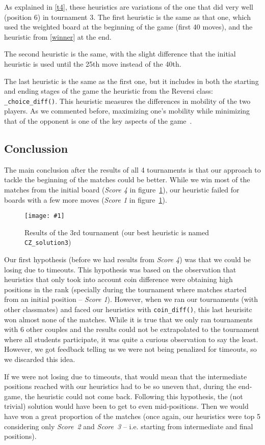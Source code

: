 \documentclass{article}
\newcommand{\myFigure}[4]{%
    \begin{figure}[H]
        \texttt{[image: \#1]}
        \centering
        \caption{#2}
        \label{#3}
    \end{figure}
}
\begin{document}
As explained in \ref{t4}, these heuristics are variations of the one that did very well (position 6) in tournament 3. The first heuristic is the same as that one, which used the weighted board at the beginning of the game (first 40 moves), and the heuristic from \ref{winner} at the end.

The second heuristic is the same, with the slight difference that the initial heuristic is used until the 25th move instead of the 40th.

The last heuristic is the same as the first one, but it includes in both the starting and ending stages of the game the heuristic from the Reversi class: \texttt{\_choice\_diff()}. This heuristic measures the differences in mobility of the two players. As we commented before, maximizing one's mobility while minimizing that of the opponent is one of the key aspects of the game~\autocite{reversistrategy}.

\subsection{Conclussion}

The main conclusion after the results of all 4 tournaments is that our approach to tackle the beginning of the matches could be better. While we win most of the matches from the initial board (\emph{Score 4} in figure~\ref{tour3}), our heuristic failed for boards with a few more moves (\emph{Score 1} in figure~\ref{tour3}).

\myFigure{./images/tour3}{Results of the 3rd tournament (our best heuristic is named \texttt{CZ\_solution3})}{tour3}{.8}

Our first hypothesis (before we had results from \emph{Score 4}) was that we could be losing due to timeouts. This hypothesis was based on the observation that heuristics that only took into account coin difference were obtaining high positions in the rank (specially during the tournament where matches started from an initial position -- \emph{Score 1}). However, when we ran our tournaments (with other classmates) and faced our heuristics with \texttt{coin\_diff()}, this last heurisitc won almost none of the matches. While it is true that we only ran tournaments with 6 other couples and the results could not be extrapolated to the tournament where all students participate, it was quite a curious observation to say the least. However, we got feedback telling us we were not being penalized for timeouts, so we discarded this idea.

If we were not losing due to timeouts, that would mean that the intermediate positions reached with our heuristics had to be so uneven that, during the end-game, the heuristic could not come back. Following this hypothesis, the (not trivial) solution would have been to get to even mid-positions. Then we would have won a great proportion of the matches (once again, our heuristics were top 5 considering only \emph{Score~2} and \emph{Score~3} -- i.e. starting from intermediate and final positions). 
\end{document}
